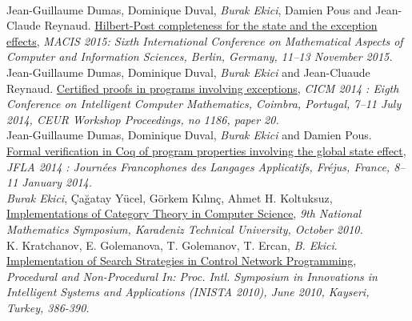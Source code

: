 \documentclass[10pt, a4paper]{article}
\newcommand{\years}[1]{\marginnote{\scriptsize #1}}
\begin{document}
 \\[0.20cm]
\years{\normalsize2015}
Jean-Guillaume Dumas, Dominique Duval, \emph{Burak Ekici}, Damien Pous and Jean-Claude Reynaud. 
\href{https://hal.archives-ouvertes.fr/hal-01121924}{Hilbert-Post completeness for the state and the exception effects}, 
\emph{MACIS 2015: Sixth International Conference on Mathematical Aspects of Computer and Information Sciences, Berlin,
Germany, 11–13 November 2015.}
 \\[0.20cm]
\years{\normalsize2014}Jean-Guillaume Dumas, Dominique Duval, \emph{Burak Ekici} and Jean-Cluaude Reynaud. \href{https://hal.archives-ouvertes.fr/hal-00867237}{Certified proofs in programs involving exceptions}, \textit{CICM 2014 : Eigth Conference on Intelligent Computer Mathematics, Coimbra, Portugal, 7--11 July 2014,
CEUR Workshop Proceedings, no 1186, paper 20. }\\[0.25cm]
\years{\normalsize2014}Jean-Guillaume Dumas, Dominique Duval, \emph{Burak Ekici} and Damien Pous.
{\href{https://hal.archives-ouvertes.fr/hal-00869230}{Formal verification in Coq of program properties involving the global state effect}}, \textit{JFLA 2014 : Journées Francophones des Langages Applicatifs, Fréjus, France, 8--11 January 2014. }
 \\[0.20cm]
\years{\normalsize2010} \emph{Burak Ekici}, Çağatay Yücel, Görkem Kılınç, Ahmet H. Koltuksuz,
\href{http://ekiciburak.github.io/}{Implementations of Category Theory in Computer Science}, \emph{9th National Mathematics Symposium, Karadeniz Technical University, October 2010.}
 \\[0.20cm]
\years{\normalsize2010} K. Kratchanov, E. Golemanova, T. Golemanov, T. Ercan, \emph{B. Ekici}.
\href{http://arxiv.org/abs/1412.4184}{Implementation of Search Strategies in Control Network Programming}, \emph{Procedural and Non-Procedural In: Proc. Intl. Symposium in Innovations in Intelligent Systems
and Applications (INISTA 2010), June 2010, Kayseri, Turkey, 386-390.}
\end{document}
